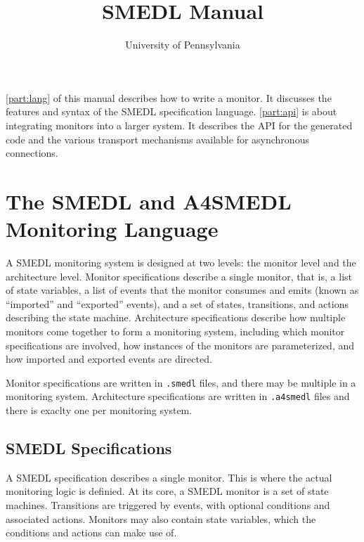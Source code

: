 \documentclass[paper=letter]{scrreport}
\title{SMEDL Manual}
\author{University of Pennsylvania}
\begin{document}
\maketitle


\autoref{part:lang} of this manual describes how to write a monitor. It discusses the features and syntax of the SMEDL specification language. \autoref{part:api} is about integrating monitors into a larger system. It describes the API for the generated code and the various transport mechanisms available for asynchronous connections.

\part{The SMEDL and A4SMEDL Monitoring Language}
\label{part:lang}

A SMEDL monitoring system is designed at two levels: the monitor level and
the architecture level. Monitor specifications describe a single monitor, that
is, a list of state variables, a list of events that the monitor consumes and
emits (known as ``imported'' and ``exported'' events), and a set of states,
transitions, and actions describing the state machine. Architecture
specifications describe how multiple monitors come together to form a
monitoring system, including which monitor specifications are involved, how
instances of the monitors are parameterized, and how imported and exported
events are directed.

Monitor specifications are written in \verb|.smedl| files, and there may be
multiple in a monitoring system. Architecture specifications are written in
\verb|.a4smedl| files and there is exaclty one per monitoring system.

\chapter{SMEDL Specifications}
\label{ch:smedl}

A SMEDL specification describes a single monitor. This is where the actual
monitoring logic is definied. At its core, a SMEDL monitor is a set of state
machines. Transitions are triggered by events, with optional conditions and
associated actions. Monitors may also contain state variables, which the
conditions and actions can make use of.



\end{document}
